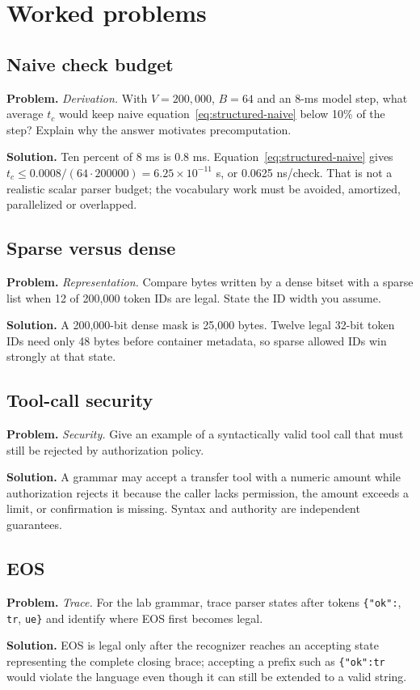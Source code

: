 \section{Worked problems}

\subsection{Naive check budget}
\textbf{Problem.} \emph{Derivation.} With $V=200{,}000$, $B=64$ and an 8-ms model step, what
average $t_c$ would keep naive equation~\eqref{eq:structured-naive} below 10\% of the
step? Explain why the answer motivates precomputation.

\textbf{Solution.} Ten percent of 8 ms is 0.8 ms. Equation~\eqref{eq:structured-naive} gives
$t_c\le0.0008/(64\cdot200000)=6.25\times10^{-11}$ s, or 0.0625 ns/check.
That is not a realistic scalar parser budget; the vocabulary work must be avoided,
amortized, parallelized or overlapped.

\subsection{Sparse versus dense}
\textbf{Problem.} \emph{Representation.} Compare bytes written by a dense bitset with a sparse
list when 12 of 200,000 token IDs are legal. State the ID width you assume.

\textbf{Solution.} A 200,000-bit dense mask is 25,000 bytes. Twelve legal 32-bit token IDs need only
48 bytes before container metadata, so sparse allowed IDs win strongly at that state.

\subsection{Tool-call security}
\textbf{Problem.} \emph{Security.} Give an example of a syntactically valid tool call that must
still be rejected by authorization policy.

\textbf{Solution.} A grammar may accept a transfer tool with a numeric amount while authorization rejects
it because the caller lacks permission, the amount exceeds a limit, or confirmation is
missing. Syntax and authority are independent guarantees.

\subsection{EOS}
\textbf{Problem.} \emph{Trace.} For the lab grammar, trace parser states after tokens
\texttt{\{"ok":}, \texttt{tr}, \texttt{ue\}} and identify where EOS first becomes
legal.

\textbf{Solution.} EOS is legal only after the recognizer reaches an accepting state representing the
complete closing brace; accepting a prefix such as \texttt{\{"ok":tr} would violate
the language even though it can still be extended to a valid string.
